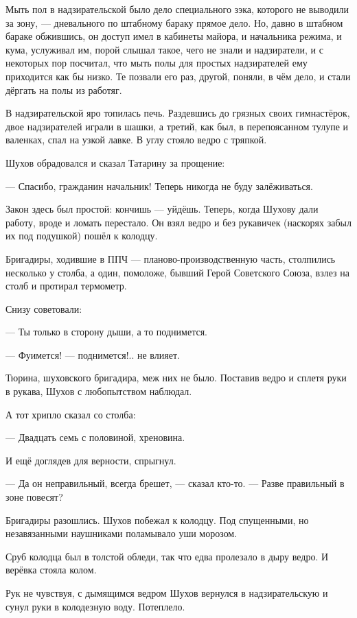 Мыть пол в надзирательской было дело специального зэка, которого не выводили за зону, --- 
дневального по штабному бараку прямое дело. Но, давно в штабном бараке обжившись, он доступ 
имел в кабинеты майора, и начальника режима, и кума, услуживал им, порой слышал такое, чего не 
знали и надзиратели, и с некоторых пор посчитал, что мыть полы для простых надзирателей ему 
приходится как бы низко. Те позвали его раз, другой, поняли, в чём дело, и стали дёргать на 
полы из работяг.

В надзирательской яро топилась печь. Раздевшись до грязных своих гимнастёрок, двое 
надзирателей играли в шашки, а третий, как был, в перепоясанном тулупе и валенках, спал на 
узкой лавке. В углу стояло ведро с тряпкой.

Шухов обрадовался и сказал Татарину за прощение:

--- Спасибо, гражданин начальник! Теперь никогда не буду залёживаться.

Закон здесь был простой: кончишь --- уйдёшь. Теперь, когда Шухову дали работу, вроде и ломать 
перестало. Он взял ведро и без рукавичек (наскорях забыл их под подушкой) пошёл к колодцу.

Бригадиры, ходившие в ППЧ --- планово-производственную часть, столпились несколько у столба, 
а один, помоложе, бывший Герой Советского Союза, взлез на столб и протирал термометр.

Снизу советовали:

--- Ты только в сторону дыши, а то поднимется.

--- Фуимется! --- поднимется!.. не влияет.

Тюрина, шуховского бригадира, меж них не было. Поставив ведро и сплетя руки в рукава, Шухов с 
любопытством наблюдал.

А тот хрипло сказал со столба:

--- Двадцать семь с половиной, хреновина.

И ещё доглядев для верности, спрыгнул.

--- Да он неправильный, всегда брешет, --- сказал кто-то. --- Разве правильный в зоне повесят?

Бригадиры разошлись. Шухов побежал к колодцу. Под спущенными, но незавязанными наушниками 
поламывало уши морозом.

Сруб колодца был в толстой обледи, так что едва пролезало в дыру ведро. И верёвка стояла 
колом.

Рук не чувствуя, с дымящимся ведром Шухов вернулся в надзирательскую и сунул руки в 
колодезную воду. Потеплело.

